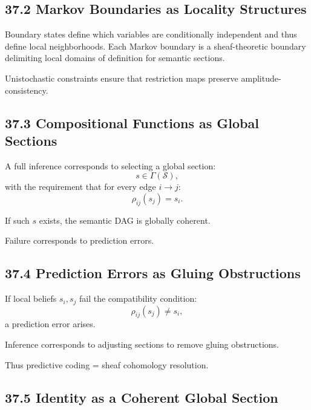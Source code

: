 \documentclass[12pt,letterpaper]{article}
\theoremstyle{remark}
\begin{document}
\subsection{37.2 Markov Boundaries as Locality Structures}

Boundary states define which variables are conditionally independent and thus define local neighborhoods. Each Markov boundary is a sheaf-theoretic boundary delimiting local domains of definition for semantic sections.

Unistochastic constraints ensure that restriction maps preserve amplitude-consistency.

\subsection{37.3 Compositional Functions as Global Sections}

A full inference corresponds to selecting a global section:
\[
s \in \Gamma(\mathcal{S}),
\]
with the requirement that for every edge $i\to j$:
\[
\rho_{ij}(s_j) = s_i.
\]

If such $s$ exists, the semantic DAG is globally coherent.

Failure corresponds to prediction errors.

\subsection{37.4 Prediction Errors as Gluing Obstructions}

If local beliefs $s_i, s_j$ fail the compatibility condition:
\[
\rho_{ij}(s_j) \ne s_i,
\]
a prediction error arises.

Inference corresponds to adjusting sections to remove gluing obstructions.

Thus predictive coding = sheaf cohomology resolution.

\subsection{37.5 Identity as a Coherent Global Section}
\end{document}
